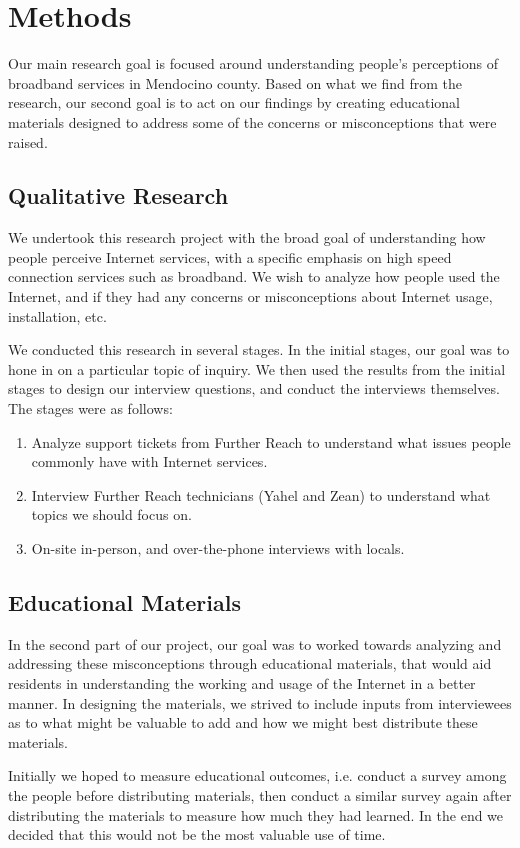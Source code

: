 \section{Methods}
\label{sec:methods}

Our main research goal is focused around understanding people's perceptions of
broadband services in Mendocino county. Based on what we find from the research,
our second goal is to act on our findings by creating educational materials
designed to address some of the concerns or misconceptions that were raised.

\subsection{Qualitative Research}
\label{subsec:qualitative_research}

We undertook this research project with the broad goal of understanding how
people perceive Internet services, with a specific emphasis on high speed
connection services such as broadband. We wish to analyze how people used
the Internet, and if they had any concerns or misconceptions about Internet
usage, installation, etc.

We conducted this research in several stages. In the initial stages, our goal
was to hone in on a particular topic of inquiry. We then used the results from the
initial stages to design our interview questions, and conduct the interviews
themselves. The stages were as follows:

\begin{enumerate}
\item Analyze support tickets from Further Reach to understand what issues
people commonly have with Internet services.
\item Interview Further Reach technicians (Yahel and Zean) to understand what
topics we should focus on.
\item On-site in-person, and over-the-phone interviews with locals.
\end{enumerate}

\subsection{Educational Materials}

In the second part of our project, our goal was to worked towards analyzing
and addressing these misconceptions through educational materials, that would
aid residents in understanding the working and usage of the Internet in a
better manner. In designing the materials, we strived to include inputs from
interviewees as to what might be valuable to add and how we might best
distribute these materials.

Initially we hoped to measure educational outcomes, i.e. conduct a survey among the people before
distributing materials, then  conduct a similar survey again after distributing the materials
to measure how much they had learned. In the end we decided that this would
not be the most valuable use of time.


